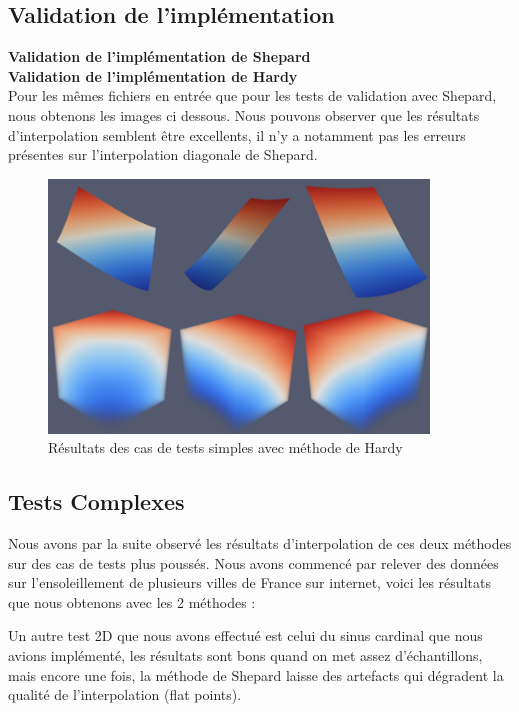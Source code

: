 \documentclass[a4paper,9pt]{article}
\begin{document}
\subsection{Validation de l'implémentation}
\label{subsec:validation_implementation}
\textbf{Validation de l'implémentation de Shepard}\\
\textbf{Validation de l'implémentation de Hardy}\\
Pour les mêmes fichiers en entrée que pour les tests de validation avec Shepard, nous obtenons les images ci dessous. Nous pouvons observer que les résultats d'interpolation semblent être excellents, il n'y a notamment pas les erreurs présentes sur l'interpolation diagonale de Shepard.
\begin{figure}[!h]
\centering
\includegraphics[width=0.9\textwidth]{images/multiquadric/tests_simples_mq.png}
\caption{Résultats des cas de tests simples avec méthode de Hardy}
\end{figure}


\subsection{Tests Complexes}
\label{subsec:tests_complexes}
Nous avons par la suite observé les résultats d'interpolation de ces deux méthodes sur des cas de tests plus poussés. Nous avons commencé par relever des données sur l'ensoleillement de plusieurs villes de France sur internet, voici les résultats que nous obtenons avec les 2 méthodes :

Un autre test 2D que nous avons effectué est celui du sinus cardinal que nous avions implémenté, les résultats sont bons quand on met assez d'échantillons, mais encore une fois, la méthode de Shepard laisse des artefacts qui dégradent la qualité de l'interpolation (flat points).
\end{document}
